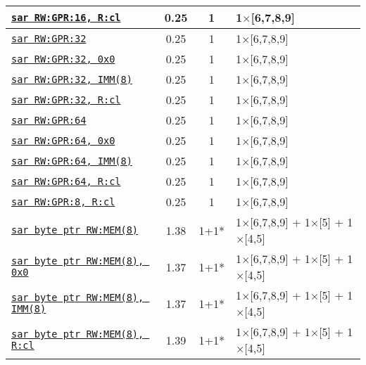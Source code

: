 \documentclass[a4paper,english,fontsize=9]{scrartcl}
\begin{document}
\begin{longtable}{p{}ccL{.25\textwidth}}
  \midrule
  \texttt{\href{https://felixcloutier.com/x86/SAL:SAR:SHL:SHR.html}{sar RW:GPR:16, R:cl}} & 0.25 & 1 & 1\(\times\)[6,7,8,9] \\
  \midrule
  \texttt{\href{https://felixcloutier.com/x86/SAL:SAR:SHL:SHR.html}{sar RW:GPR:32}} & 0.25 & 1 & 1\(\times\)[6,7,8,9] \\
  \midrule
  \texttt{\href{https://felixcloutier.com/x86/SAL:SAR:SHL:SHR.html}{sar RW:GPR:32, 0x0}} & 0.25 & 1 & 1\(\times\)[6,7,8,9] \\
  \midrule
  \texttt{\href{https://felixcloutier.com/x86/SAL:SAR:SHL:SHR.html}{sar RW:GPR:32, IMM(8)}} & 0.25 & 1 & 1\(\times\)[6,7,8,9] \\
  \midrule
  \texttt{\href{https://felixcloutier.com/x86/SAL:SAR:SHL:SHR.html}{sar RW:GPR:32, R:cl}} & 0.25 & 1 & 1\(\times\)[6,7,8,9] \\
  \midrule
  \texttt{\href{https://felixcloutier.com/x86/SAL:SAR:SHL:SHR.html}{sar RW:GPR:64}} & 0.25 & 1 & 1\(\times\)[6,7,8,9] \\
  \midrule
  \texttt{\href{https://felixcloutier.com/x86/SAL:SAR:SHL:SHR.html}{sar RW:GPR:64, 0x0}} & 0.25 & 1 & 1\(\times\)[6,7,8,9] \\
  \midrule
  \texttt{\href{https://felixcloutier.com/x86/SAL:SAR:SHL:SHR.html}{sar RW:GPR:64, IMM(8)}} & 0.25 & 1 & 1\(\times\)[6,7,8,9] \\
  \midrule
  \texttt{\href{https://felixcloutier.com/x86/SAL:SAR:SHL:SHR.html}{sar RW:GPR:64, R:cl}} & 0.25 & 1 & 1\(\times\)[6,7,8,9] \\
  \midrule
  \texttt{\href{https://felixcloutier.com/x86/SAL:SAR:SHL:SHR.html}{sar RW:GPR:8, R:cl}} & 0.25 & 1 & 1\(\times\)[6,7,8,9] \\
  \midrule
  \texttt{\href{https://felixcloutier.com/x86/SAL:SAR:SHL:SHR.html}{sar byte ptr RW:MEM(8)}} & 1.38 & 1+1* & 1\(\times\)[6,7,8,9] + 1\(\times\)[5] + 1\(\times\)[4,5] \\
  \midrule
  \texttt{\href{https://felixcloutier.com/x86/SAL:SAR:SHL:SHR.html}{sar byte ptr RW:MEM(8), 0x0}} & 1.37 & 1+1* & 1\(\times\)[6,7,8,9] + 1\(\times\)[5] + 1\(\times\)[4,5] \\
  \midrule
  \texttt{\href{https://felixcloutier.com/x86/SAL:SAR:SHL:SHR.html}{sar byte ptr RW:MEM(8), IMM(8)}} & 1.37 & 1+1* & 1\(\times\)[6,7,8,9] + 1\(\times\)[5] + 1\(\times\)[4,5] \\
  \midrule
  \texttt{\href{https://felixcloutier.com/x86/SAL:SAR:SHL:SHR.html}{sar byte ptr RW:MEM(8), R:cl}} & 1.39 & 1+1* & 1\(\times\)[6,7,8,9] + 1\(\times\)[5] + 1\(\times\)[4,5] \\

\end{longtable}
\end{document}
